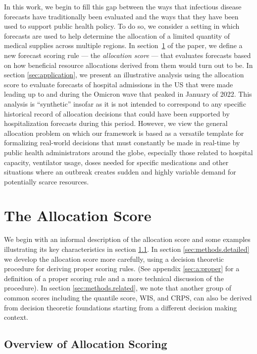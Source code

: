 \documentclass{article}
\begin{document}
In this work, we begin to fill this gap between the ways that infectious disease forecasts have traditionally been
evaluated and the ways that they have been used to support public health policy. To do so, we consider a setting in
which forecasts are used to help determine the allocation of a limited quantity of medical supplies across multiple
regions. In section~\ref{sec:methods} of the paper, we define a new forecast scoring rule --- the {\em allocation score}
--- that evaluates forecasts based on how beneficial resource allocations derived from them would turn out to be. In
section \ref{sec:application}, we present an illustrative analysis using the allocation score to evaluate forecasts of
hospital admissions in the US that were made leading up to and during the Omicron wave that peaked in January of 2022.
This analysis is ``synthetic'' insofar as it is not intended to correspond to any specific historical record of
allocation decisions that could have been supported by hospitalization forecasts during this period. However, we view
the general allocation problem on which our framework is based as a versatile template for formalizing real-world
decisions that must constantly be made in real-time by public health administrators around the globe, especially those
related to hospital capacity, ventilator usage, doses needed for specific medications and other situations where an
outbreak creates sudden and highly variable demand for potentially scarce resources.  

\section{The Allocation Score}
\label{sec:methods}

We begin with an informal description of the allocation score and some examples illustrating its key characteristics in
section \ref{sec:methods.overview}. In section \ref{sec:methods.detailed} we develop the allocation score more
carefully, using a decision theoretic procedure for deriving proper scoring rules. (See appendix \ref{sec:a:proper}
for a definition of a proper scoring rule and a more technical discussion of the procedure). In section
\ref{sec:methods.related}, we note that another group of common scores including the quantile score, WIS, and CRPS, can
also be derived from decision theoretic foundations \textemdash starting from a different decision making context.

\subsection{Overview of Allocation Scoring}
\label{sec:methods.overview}
\end{document}
